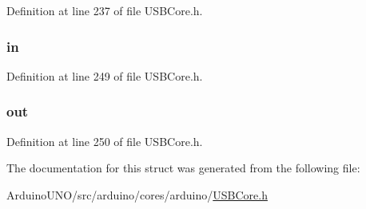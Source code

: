 Definition at line 237 of file U\+S\+B\+Core.\+h.

\hypertarget{struct_c_d_c_descriptor_a93dcef3b3e3062b904269bcad94771b5}{}
\subsubsection[{in}]{ in}\label{struct_c_d_c_descriptor_a93dcef3b3e3062b904269bcad94771b5}


Definition at line 249 of file U\+S\+B\+Core.\+h.

\hypertarget{struct_c_d_c_descriptor_afcf3c947c6e5ace7853bc3e313c0c4aa}{}
\subsubsection[{out}]{ out}\label{struct_c_d_c_descriptor_afcf3c947c6e5ace7853bc3e313c0c4aa}


Definition at line 250 of file U\+S\+B\+Core.\+h.



The documentation for this struct was generated from the following file\+:\begin{DoxyCompactItemize}
\item 
Arduino\+U\+N\+O/src/arduino/cores/arduino/\hyperlink{_u_s_b_core_8h}{U\+S\+B\+Core.\+h}\end{DoxyCompactItemize}
